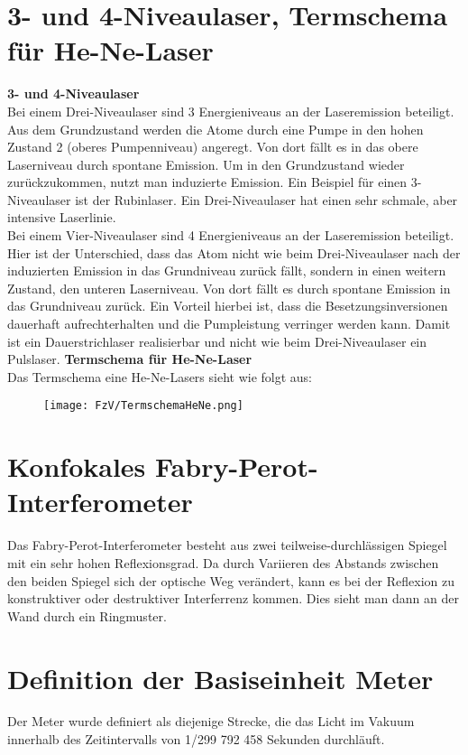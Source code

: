 \section{3- und 4-Niveaulaser, Termschema für He-Ne-Laser}
\textbf{3- und 4-Niveaulaser}\\
Bei einem Drei-Niveaulaser sind 3 Energieniveaus an der Laseremission beteiligt.
Aus dem Grundzustand werden die Atome durch eine Pumpe in den hohen Zustand 2 (oberes Pumpenniveau) angeregt.
Von dort fällt es in das obere Laserniveau durch spontane Emission.
Um in den Grundzustand wieder zurückzukommen, nutzt man induzierte Emission.
Ein Beispiel für einen 3-Niveaulaser ist der Rubinlaser.
Ein Drei-Niveaulaser hat einen sehr schmale, aber intensive Laserlinie.\\
Bei einem Vier-Niveaulaser sind 4 Energieniveaus an der Laseremission beteiligt.
Hier ist der Unterschied, dass das Atom nicht wie beim Drei-Niveaulaser nach der induzierten Emission in das Grundniveau zurück fällt, sondern in einen weitern Zustand, den unteren Laserniveau.
Von dort fällt es durch spontane Emission in das Grundniveau zurück.
Ein Vorteil hierbei ist, dass die Besetzungsinversionen dauerhaft aufrechterhalten und die Pumpleistung verringer werden kann.
Damit ist ein Dauerstrichlaser realisierbar und nicht wie beim Drei-Niveaulaser ein Pulslaser.
\textbf{Termschema für He-Ne-Laser}\\
Das Termschema eine He-Ne-Lasers sieht wie folgt aus:
\begin{center}
    \begin{figure}[h]
        \texttt{[image: FzV/TermschemaHeNe.png]}
    \end{figure}
\end{center}

\section{Konfokales Fabry-Perot-Interferometer}
Das Fabry-Perot-Interferometer besteht aus zwei teilweise-durchlässigen Spiegel mit ein sehr hohen Reflexionsgrad.
Da durch Variieren des Abstands zwischen den beiden Spiegel sich der optische Weg verändert, kann es bei der Reflexion zu konstruktiver oder destruktiver Interferrenz kommen.
Dies sieht man dann an der Wand durch ein Ringmuster.
\section{Definition der Basiseinheit Meter}
Der Meter wurde definiert als diejenige Strecke, die das Licht im Vakuum innerhalb des Zeitintervalls von 1/299 792 458 Sekunden durchläuft.
